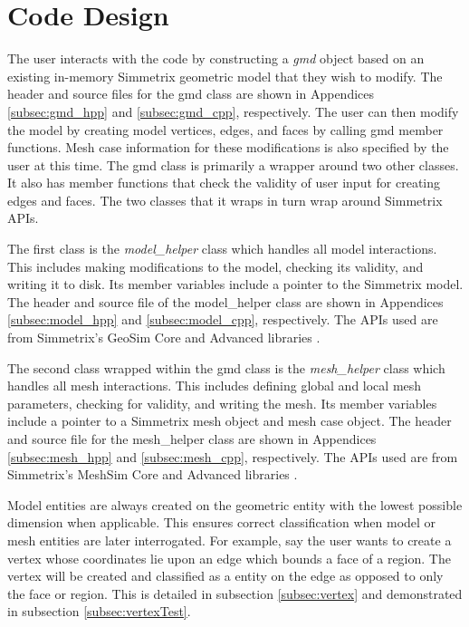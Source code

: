 \documentclass[a4paper, 12pt]{article}
\begin{document}
\section{Code Design} \label{sec:design}
The user interacts with the code by constructing a \emph{gmd}
object based on an existing in-memory Simmetrix geometric model that they 
wish to modify. The header and source files for the gmd class 
are shown in Appendices \ref{subsec:gmd_hpp} and \ref{subsec:gmd_cpp}, 
respectively.  The user can then modify the model by 
creating model vertices, edges, and faces by calling
gmd member functions. Mesh case information for these 
modifications is also specified by the user at this time.
The gmd class is primarily a wrapper around two other classes. It also
has member functions that check the validity of user input for creating 
edges and faces. The two classes that it 
wraps in turn wrap around Simmetrix APIs.

The first class is the \emph{model\_helper} class 
which handles all model interactions. This includes making modifications to
the model, checking its validity, and writing it to disk. 
Its member variables
include a pointer to the Simmetrix model. The header and source file of the 
model\_helper class are shown in Appendices \ref{subsec:model_hpp} and 
\ref{subsec:model_cpp}, respectively. The APIs used are from Simmetrix's 
GeoSim Core and Advanced libraries \cite{Simmetrix}. 

The second class wrapped within the gmd class is the
\emph{mesh\_helper} class which handles all mesh interactions. This includes
defining global and local mesh parameters, checking for validity, 
and writing the mesh. 
Its member variables include a pointer to a Simmetrix mesh object 
and mesh case object. 
The header and source file for the mesh\_helper class are shown in 
Appendices \ref{subsec:mesh_hpp} and \ref{subsec:mesh_cpp}, respectively.
The APIs used are from Simmetrix's MeshSim Core and Advanced libraries 
\cite{Simmetrix}.

Model entities are always created on the geometric entity with the
lowest possible dimension when applicable. This ensures 
correct classification when model
or mesh entities are later interrogated. For example, say the
user wants to create a vertex whose coordinates lie upon an edge
which bounds a face of a region. The vertex will be created and 
classified as a entity on the edge as opposed to only the face or region. 
This is detailed in subsection \ref{subsec:vertex} and  demonstrated 
in subsection \ref{subsec:vertexTest}.
\end{document}
